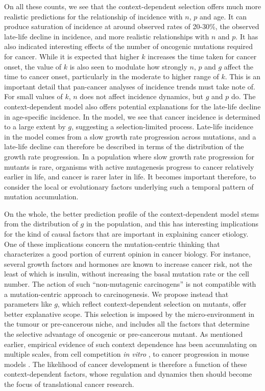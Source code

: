 \documentclass[9pt,twocolumn,twoside]{pnas-new}
\begin{document}
On all these counts, we see that the context-dependent selection offers much more realistic predictions for the relationship of incidence with $n$, $p$ and age. It can produce saturation of incidence at around observed rates of 20-30\%, the observed late-life decline in incidence, and more realistic relationships with $n$ and $p$. It has also indicated interesting effects of the number of oncogenic mutations required for cancer. While it is expected that higher $k$ increases the time taken for cancer onset, the value of $k$ is also seen to modulate how strongly $n$, $p$ and $g$ affect the time to cancer onset, particularly in the moderate to higher range of $k$. This is an important detail that pan-cancer analyses of incidence trends must take note of. For small values of $k$, $n$ does not affect incidence dynamics, but $g$ and $p$ do. The context-dependent model also offers potential explanations for the late-life decline in age-specific incidence. In the model, we see that cancer incidence is determined to a large extent by $g$, suggesting a selection-limited process. Late-life incidence in the model comes from a slow growth rate progression across mutations, and a late-life decline can therefore be described in terms of the distribution of the growth rate progression. In a population where slow growth rate progression for mutants is rare, organisms with active mutagenesis progress to cancer relatively earlier in life, and cancer is rarer later in life. It becomes important therefore, to consider the local or evolutionary factors underlying such a temporal pattern of mutation accumulation. 

On the whole, the better prediction profile of the context-dependent model stems from the distribution of $g$ in the population, and this has interesting implications for the kind of causal factors that are important in explaining cancer etiology. One of these implications concern the mutation-centric thinking that characterizes a good portion of current opinion in cancer biology. For instance, several growth factors and hormones are known to increase cancer risk, not the least of which is insulin, without increasing the basal mutation rate or the cell number. The action of such ``non-mutagenic carcinogens'' is not compatible with a mutation-centric approach to carcinogenesis. We propose instead that parameters like $g$, which reflect context-dependent selection on mutants, offer better explanative scope. This selection is imposed by the micro-environment in the tumour or pre-cancerous niche, and includes all the factors that determine the selective advantage of oncogenic or pre-cancerous mutant. As mentioned earlier, empirical evidence of such context dependence has been accumulating on multiple scales, from cell competition \textit{in vitro} \cite{Archetti2015}, to cancer progression in mouse models \cite{Cao2010}. The likelihood of cancer development is therefore a function of these context-dependent factors, whose regulation and dynamics then should become the focus of translational cancer research.
\end{document}
